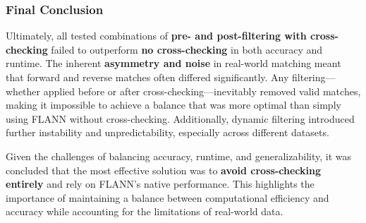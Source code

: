 \subsubsection{Final Conclusion}  
Ultimately, all tested combinations of \textbf{pre- and post-filtering with cross-checking} failed to outperform \textbf{no cross-checking} in both accuracy and runtime. The inherent \textbf{asymmetry and noise} in real-world matching meant that forward and reverse matches often differed significantly. Any filtering—whether applied before or after cross-checking—inevitably removed valid matches, making it impossible to achieve a balance that was more optimal than simply using FLANN without cross-checking. Additionally, dynamic filtering introduced further instability and unpredictability, especially across different datasets. 

Given the challenges of balancing accuracy, runtime, and generalizability, it was concluded that the most effective solution was to \textbf{avoid cross-checking entirely} and rely on FLANN’s native performance. This highlights the importance of maintaining a balance between computational efficiency and accuracy while accounting for the limitations of real-world data. 





